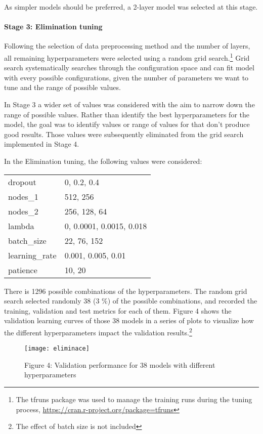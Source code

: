 \documentclass[]{article}
\let\oldparagraph\paragraph
\renewcommand{\paragraph}[1]{\oldparagraph{#1}\mbox{}}
\let\rmarkdownfootnote\footnote%
\def\footnote{\protect\rmarkdownfootnote}
\begin{document}
As simpler models should be preferred, a 2-layer model was selected at
this stage.

\hypertarget{stage-3-elimination-tuning}{%
\paragraph{Stage 3: Elimination
tuning}\label{stage-3-elimination-tuning}}

Following the selection of data preprocessing method and the number of
layers, all remaining hyperparameters were selected using a random grid
search.\footnote{The tfruns package was used to manage the training runs
  during the tuning process,
  \url{https://cran.r-project.org/package=tfruns}} Grid search
systematically searches through the configuration space and can fit
model with every possible configurations, given the number of parameters
we want to tune and the range of possible values.

In Stage 3 a wider set of values was considered with the aim to narrow
down the range of possible values. Rather than identify the best
hyperparameters for the model, the goal was to identify values or range
of values for that don't produce good results. Those values were
subsequently eliminated from the grid search implemented in Stage 4.

In the Elimination tuning, the following values were considered:

\begin{longtable}[]{@{}ll@{}}
\toprule
\endhead
dropout & 0, 0.2, 0.4\tabularnewline
nodes\_1 & 512, 256\tabularnewline
nodes\_2 & 256, 128, 64\tabularnewline
lambda & 0, 0.0001, 0.0015, 0.018\tabularnewline
batch\_size & 22, 76, 152\tabularnewline
learning\_rate & 0.001, 0.005, 0.01\tabularnewline
patience & 10, 20\tabularnewline
\bottomrule
\end{longtable}

There is 1296 possible combinations of the hyperparameters. The random
grid search selected randomly 38 (3 \%) of the possible combinations,
and recorded the training, validation and test metrics for each of them.
Figure 4 shows the validation learning curves of those 38 models in a
series of plots to visualize how the different hyperparameters impact
the validation results.\footnote{The effect of batch size is not
  included}

\begin{figure}

{\centering \texttt{[image: eliminace]} 

}

\caption{Figure 4: Validation performance for 38 models with different hyperparameters}\label{fig:unnamed-chunk-5}
\end{figure}
\end{document}
